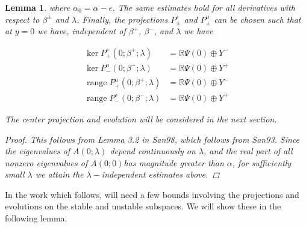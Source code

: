 \documentclass[12pt]{article}
\def\R{{\mathbb R}}
\DeclareMathOperator{\ran}{range}
\newtheorem{lemma}{Lemma}
\begin{document}
\begin{lemma}
where $\alpha_0 = \alpha - \epsilon$. The same estimates hold for all derivatives with respect to $\beta^\pm$ and $\lambda$. Finally, the projections $P^s_\pm$ and $P^u_\pm$ can be chosen such that at $y = 0$ we have, independent of $\beta^+$, $\beta^-$, and $\lambda$ we have

\begin{align*}
\ker P^s_+(0; \beta^+; \lambda) &= \R \Psi(0) \oplus Y^- \\
\ker P^u_-(0; \beta^-; \lambda) &= \R \Psi(0) \oplus Y^+ \\
\ran P^u_+(0; \beta^+; \lambda) &= \R \Psi(0) \oplus Y^- \\
\ran P^s_-(0; \beta^-; \lambda) &= \R \Psi(0) \oplus Y^+
\end{align*}

The center projection and evolution will be considered in the next section.

\begin{proof}
This follows from Lemma 3.2 in San98, which follows from San93. Since the eigenvalues of $A(0; \lambda)$ depend continuously on $\lambda$, and the real part of all nonzero eigenvalues of $A(0; 0)$has magnitude greater than $\alpha$, for sufficiently small $\lambda$ we attain the $\lambda-$independent estimates above. 
\end{proof}
\end{lemma}

In the work which follows, will need a few bounds involving the projections and evolutions on the stable and unstable subspaces. We will show these in the following lemma.

\end{document}
